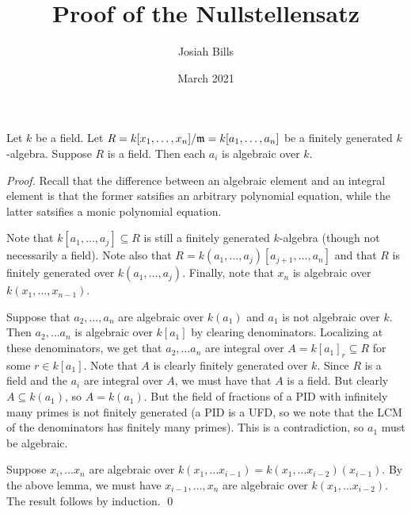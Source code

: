 \documentclass{article}
\title{Proof of the Nullstellensatz}
\author{Josiah Bills}
\date{March 2021}
\begin{document}
\maketitle

\begin{theorem}
    Let $k$ be a field. Let $R=k[x_1, \dots, x_n]/\mathfrak{m} = k[a_1, \dots, a_n]$ be a finitely
    generated $k$-algebra. Suppose $R$ is a
    field. Then each $a_i$ is algebraic over $k$.
\end{theorem}
\begin{proof}
    Recall that the difference between an algebraic element and an integral element
    is that the former satsifies an arbitrary polynomial equation, while the latter
    satsifies a monic polynomial equation.

    Note that $k[a_1, \dots, a_j] \subseteq R$ is still a finitely generated
    $k$-algebra (though not necessarily a field). Note also that
    $R=k(a_1, \dots, a_j)[a_{j+1}, \dots, a_n]$ and that $R$ is finitely generated
    over $k(a_1, \dots, a_j)$. Finally, note that $x_n$ is
    algebraic over $k(x_1, \dots, x_{n-1})$.

    Suppose that $a_2, \dots, a_n$ are algebraic over $k(a_1)$
    and $a_1$ is not algebraic over $k$. Then
    $a_2, \dots a_n$ is algebraic over $k[a_1]$ by clearing
    denominators. Localizing at these denominators, we get that
    $a_2,\dots a_n$ are integral over $A=k[a_1]_r \subseteq R$ for some
    $r \in k[a_1]$. Note that $A$ is clearly finitely
    generated over $k$. Since $R$ is a field
    and the $a_i$ are integral over $A$, we
    must have that $A$ is a field. But clearly
    $A \subseteq k(a_1)$, so $A=k(a_1)$. But the field of fractions
    of a PID with infinitely many primes is not finitely generated (a PID is a UFD,
    so we note that the LCM of the denominators has finitely many primes). This is
    a contradiction, so $a_1$ must be algebraic.

    Suppose $x_i, \dots x_n$ are algebraic over $k(x_1, \dots x_{i-1})=k(x_1, \dots
        x_{i-2})(x_{i-1})$. By
    the above lemma, we must have $x_{i-1}, \dots, x_n$ are algebraic over
    $k(x_1, \dots x_{i-2})$. The result follows by induction. \qed
\end{proof}
\end{document}
